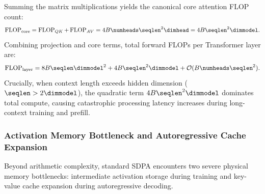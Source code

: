 Summing the matrix multiplications yields the canonical core attention FLOP count:
\begin{equation}
\operatorname{FLOP}_{\text{core}} = \operatorname{FLOP}_{QK} + \operatorname{FLOP}_{AV} = 4 B \numheads \seqlen^2 \dimhead = 4 B \seqlen^2 \dimmodel.
\label{eq:canonical_core_flops}
\end{equation}
Combining projection and core terms, total forward FLOPs per Transformer layer are:
\begin{equation}
\operatorname{FLOP}_{\text{layer}} = 8 B \seqlen \dimmodel^2 + 4 B \seqlen^2 \dimmodel + \mathcal{O}(B \numheads \seqlen^2).
\label{eq:total_forward_layer_flops}
\end{equation}
Crucially, when context length exceeds hidden dimension ($\seqlen > 2\dimmodel$), the quadratic term $4 B \seqlen^2 \dimmodel$ dominates total compute, causing catastrophic processing latency increases during long-context training and prefill.

\subsubsection{Activation Memory Bottleneck and Autoregressive Cache Expansion}
\label{subsubsec:activation_memory_bottleneck}
Beyond arithmetic complexity, standard SDPA encounters two severe physical memory bottlenecks: intermediate activation storage during training and key-value cache expansion during autoregressive decoding.


